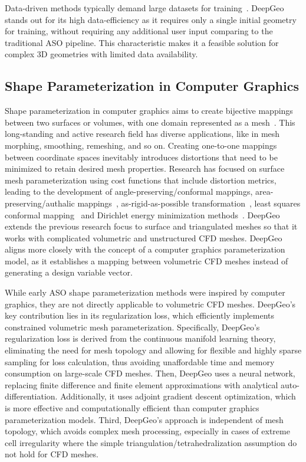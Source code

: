 Data-driven methods typically demand large datasets for training~\cite{aa.Li2022b,aa.Wei2023,aa.Li2019}. DeepGeo stands out for its high data-efficiency as it requires only a single initial geometry for training, without requiring any additional user input comparing to the traditional ASO pipeline. This characteristic makes it a feasible solution for complex 3D geometries with limited data availability.

\subsection{Shape Parameterization in Computer Graphics}
Shape parameterization in computer graphics aims to create bijective mappings between two surfaces or volumes, with one domain represented as a mesh~\cite{ai.Sheffer2006}. This long-standing and active research field has diverse applications, like in mesh morphing, smoothing, remeshing, and so on. Creating one-to-one mappings between coordinate spaces inevitably introduces distortions that need to be minimized to retain desired mesh properties. Research has focused on surface mesh parameterization using cost functions that include distortion metrics, leading to the development of angle-preserving/conformal mappings, area-preserving/authalic mappings~\cite{ai.Floater2005,ai.Sheffer2006}, as-rigid-as-possible transformation~\cite{ai.Sumner2004,ai.Sorkine2007}, least squares conformal mapping~\cite{ai.Levy2002} and Dirichlet energy minimization methods~\cite{ai.Schreiner2004,ai.Smith2015,ai.Terzopoulos1987b}. DeepGeo extends the previous research focus to surface and triangulated meshes so that it works with complicated volumetric and unstructured CFD meshes. DeepGeo aligns more closely with the concept of a computer graphics parameterization model, as it establishes a mapping between volumetric CFD meshes instead of generating a design variable vector.

While early ASO shape parameterization methods were inspired by computer graphics, they are not directly applicable to volumetric CFD meshes.  DeepGeo’s key contribution lies in its regularization loss, which efficiently implements constrained volumetric mesh parameterization. Specifically, DeepGeo's regularization loss is derived from the continuous manifold learning theory, eliminating the need for mesh topology and allowing for flexible and highly sparse sampling for loss calculation, thus avoiding unaffordable time and memory consumption on large-scale CFD meshes. Then, DeepGeo uses a neural network, replacing finite difference and finite element approximations with analytical auto-differentiation. Additionally, it uses adjoint gradient descent optimization, which is more effective and computationally efficient than computer graphics parameterization models. Third, DeepGeo’s approach is independent of mesh topology, which avoids complex mesh processing, especially in cases of extreme cell irregularity where the simple triangulation/tetrahedralization assumption do not hold for CFD meshes.

